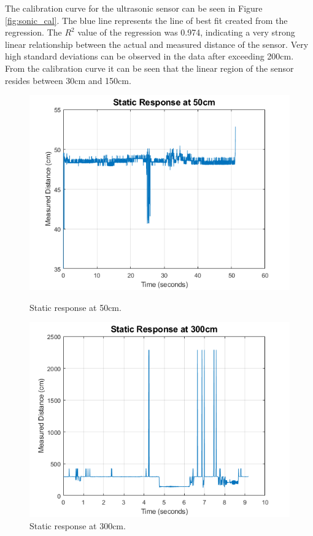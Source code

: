 \documentclass[11pt]{article}
\begin{document}
The calibration curve for the ultrasonic sensor can be seen in Figure \ref{fig:sonic_cal}. The blue line represents the line of best fit created from the regression. The $R^{2}$ value of the regression was 0.974, indicating a very strong linear relationship between the actual and measured distance of the sensor. Very high standard deviations can be observed in the data after exceeding 200cm. From the calibration curve it can be seen that the linear region of the sensor resides between 30cm and 150cm.\\

\begin{figure}[!ht]
    \centering
    \begin{minipage}{0.5\textwidth}
        \centering
        \includegraphics[width=1.0\textwidth]{pics/50static.png}
        \caption{Static response at 50cm.}
        \label{fig:50static}
    \end{minipage}\hfill
    \begin{minipage}{0.5\textwidth}
        \centering
        \includegraphics[width=1.0\textwidth]{pics/300static.png}
        \caption{Static response at 300cm.}
        \label{fig:300static}
    \end{minipage}
\end{figure}
\end{document}
